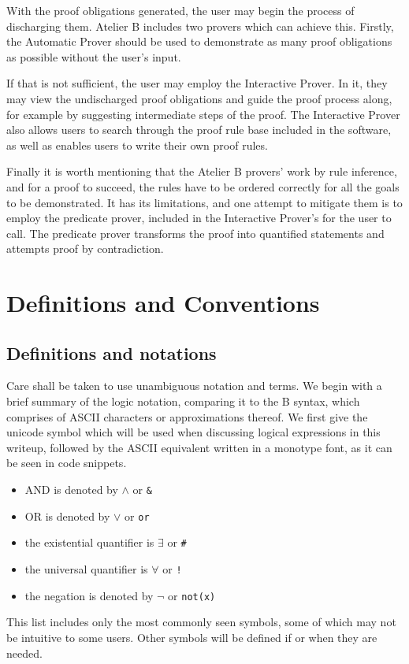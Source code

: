 \documentclass[11pt,journal]{IEEEtran}
\begin{document}
	With the proof obligations generated, the user may begin the process of discharging them. Atelier B includes two provers which can achieve this. Firstly, the Automatic Prover should be used to demonstrate as many proof obligations as possible without the user's input.
	
	If that is not sufficient, the user may employ the Interactive Prover. In it, they may view the undischarged proof obligations and guide the proof process along, for example by suggesting intermediate steps of the proof. The Interactive Prover also allows users to search through the proof rule base included in the software, as well as enables users to write their own proof rules.
	
	Finally it is worth mentioning that the Atelier B provers' work by rule inference, and for a proof to succeed, the rules have to be ordered correctly for all the goals to be demonstrated. It has its limitations, and one attempt to mitigate them is to employ the predicate prover, included in the Interactive Prover's for the user to call. The predicate prover transforms the proof into quantified statements and attempts proof by contradiction.\cite{Prover guide}
	
	
	
	\section{Definitions and Conventions}
	
	\subsection{Definitions and notations}
	Care shall be taken to use unambiguous notation and terms. We begin with a brief summary of the logic notation, comparing it to the B syntax, which comprises of ASCII characters or approximations thereof. We first give the unicode symbol which will be used when discussing logical expressions in this writeup, followed by the ASCII equivalent written in a monotype font, as it can be seen in code snippets. 
	\begin{itemize}
		\item AND is denoted by $\wedge$ or \texttt{\&}
		\item OR is denoted by $\vee$ or \texttt{or}
		\item the existential quantifier is $\exists$ or \texttt{\#}
		\item the universal quantifier is $\forall$ or \texttt{!}
		\item the negation is denoted by $\neg$ or \texttt{not(x)}
	\end{itemize}
	This list includes only the most commonly seen symbols, some of which may not be intuitive to some users. Other symbols will be defined if or when they are needed.
	
\end{document}
